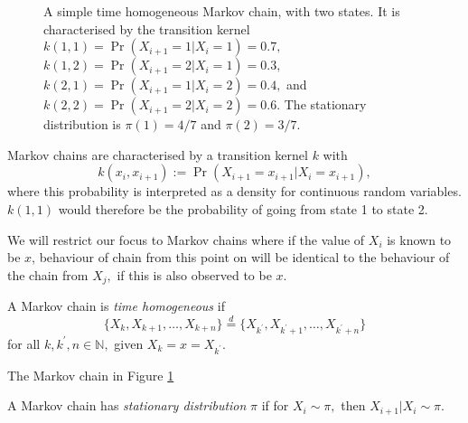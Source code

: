 \begin{figure}[htbp]
    \centering
    \caption{
        A simple time homogeneous Markov chain, with two states.
        It is characterised by the transition kernel
        $k(1, 1) = \Pr(X_{i + 1} = 1 | X_i = 1) = 0.7,$
        $k(1, 2) = \Pr(X_{i + 1} = 2 | X_i = 1) = 0.3,$
        $k(2, 1) = \Pr(X_{i + 1} = 1 | X_i = 2) = 0.4,$ and
        $k(2, 2) = \Pr(X_{i + 1} = 2 | X_i = 2) = 0.6.$ The stationary
        distribution is $\pi(1) = 4/7$ and $\pi(2) = 3/7.$
    }
    \label{fig:MC}
\end{figure}

Markov chains are characterised by a transition kernel $k$ with
$$k(x_i, x_{i + 1}) := \Pr(X_{i + 1} = x_{i + 1} | X_i = x_{i + 1}),$$
where this probability is interpreted as a density for continuous random
variables. $k(1, 1)$ would therefore be the probability of going from state 1
to state 2.

We will restrict our focus to Markov chains where
if the value of $X_i$ is known to be $x$, behaviour of chain from this point on
will be identical to the behaviour of the chain from $X_j,$ if this is also
observed to be $x$.

\begin{definition}
    A Markov chain is \emph{time homogeneous} if
    $$
        \{X_k, X_{k+1}, \dots, X_{k + n}\}
        \overset{d}{=} \{X_{k^\prime}, X_{k^\prime+1}, \dots, X_{k^\prime + n}\}
    $$
    for all $k, k^\prime, n \in \mathbb{N},$ given $X_k = x = X_{k^\prime}.$
\end{definition}

The Markov chain in Figure \ref{fig:MC}

\begin{definition}
    A Markov chain has \emph{stationary distribution} $\pi$ if for $X_i \sim \pi,$
    then $X_{i + 1} | X_i \sim \pi.$
\end{definition}

